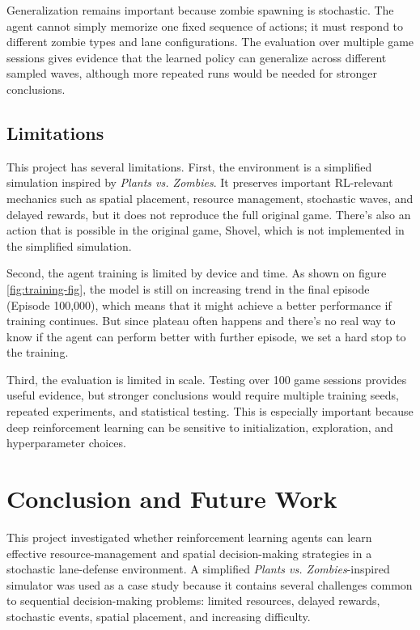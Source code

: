 \documentclass[conference,onecolumn]{IEEEtran}
\begin{document}
Generalization remains important because zombie spawning is stochastic. The agent cannot simply memorize one fixed sequence of actions; it must respond to different zombie types and lane configurations. The evaluation over multiple game sessions gives evidence that the learned policy can generalize across different sampled waves, although more repeated runs would be needed for stronger conclusions.

\subsection{Limitations}

This project has several limitations. First, the environment is a simplified simulation inspired by \textit{Plants vs. Zombies}. It preserves important RL-relevant mechanics such as spatial placement, resource management, stochastic waves, and delayed rewards, but it does not reproduce the full original game. There's also an action that is possible in the original game, Shovel, which is not implemented in the simplified simulation.

Second, the agent training is limited by device and time. As shown on figure \ref{fig:training-fig}, the model is still on increasing trend in the final episode (Episode 100,000), which means that it might achieve a better performance if training continues. But since plateau often happens and there's no real way to know if the agent can perform better with further episode, we set a hard stop to the training.

Third, the evaluation is limited in scale. Testing over 100 game sessions provides useful evidence, but stronger conclusions would require multiple training seeds, repeated experiments, and statistical testing. This is especially important because deep reinforcement learning can be sensitive to initialization, exploration, and hyperparameter choices.


\section{Conclusion and Future Work}
\label{sec:conclusion}
This project investigated whether reinforcement learning agents can learn effective resource-management and spatial decision-making strategies in a stochastic lane-defense environment. A simplified \textit{Plants vs. Zombies}-inspired simulator was used as a case study because it contains several challenges common to sequential decision-making problems: limited resources, delayed rewards, stochastic events, spatial placement, and increasing difficulty.
\end{document}
